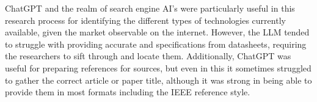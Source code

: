 \noindent ChatGPT and the realm of search engine AI's were particularly useful in this research process for identifying the different types of technologies currently available, given the market observable on the internet. However, the LLM tended to struggle with providing accurate and specifications from datasheets, requiring the researchers to sift through and locate them. Additionally, ChatGPT was useful for preparing references for sources, but even in this it sometimes struggled to gather the correct article or paper title, although it was strong in being able to provide them in most formats including the IEEE reference style.\\